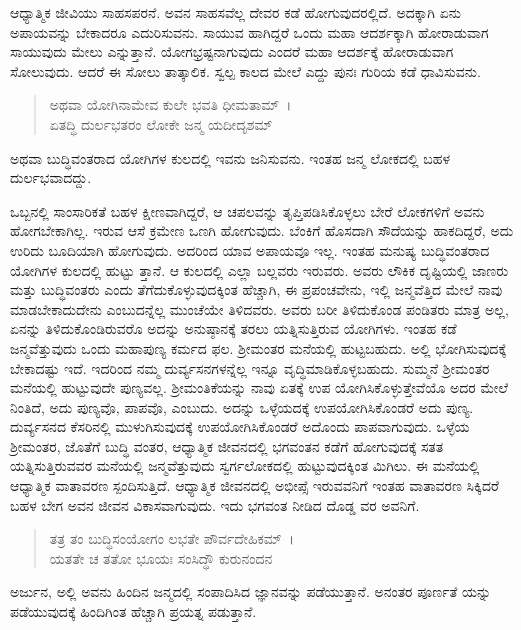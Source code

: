 ಆಧ್ಯಾತ್ಮಿಕ ಜೀವಿಯು ಸಾಹಸಪರನೆ. ಅವನ ಸಾಹಸವೆಲ್ಲ ದೇವರ ಕಡೆ ಹೋಗುವುದರಲ್ಲಿದೆ. ಅದಕ್ಕಾಗಿ ಏನು ಅಪಾಯವನ್ನು ಬೇಕಾದರೂ ಎದುರಿಸುವನು. ಸಾಯುವ ಹಾಗಿದ್ದರೆ ಒಂದು ಮಹಾ ಆದರ್ಶಕ್ಕಾಗಿ ಹೋರಾಡುವಾಗ ಸಾಯುವುದು ಮೇಲು ಎನ್ನುತ್ತಾನೆ. ಯೋಗಭ್ರಷ್ಟನಾಗುವುದು ಎಂದರೆ ಮಹಾ ಆದರ್ಶಕ್ಕೆ ಹೋರಾಡುವಾಗ ಸೋಲುವುದು. ಆದರೆ ಈ ಸೋಲು ತಾತ್ಕಾಲಿಕ. ಸ್ವಲ್ಪ ಕಾಲದ ಮೇಲೆ ಎದ್ದು ಪುನಃ ಗುರಿಯ ಕಡೆ ಧಾವಿಸುವನು.

\begin{verse}
ಅಥವಾ ಯೋಗಿನಾಮೇವ ಕುಲೇ ಭವತಿ ಧೀಮತಾಮ್~।\\ಏತದ್ಧಿ ದುರ್ಲಭತರಂ ಲೋಕೇ ಜನ್ಮ ಯದೀದೃಶಮ್ 
\end{verse}

{\small ಅಥವಾ ಬುದ್ಧಿವಂತರಾದ ಯೋಗಿಗಳ ಕುಲದಲ್ಲಿ ಇವನು ಜನಿಸುವನು. ಇಂತಹ ಜನ್ಮ ಲೋಕದಲ್ಲಿ ಬಹಳ ದುರ್ಲಭವಾದದ್ದು.}

ಒಬ್ಬನಲ್ಲಿ ಸಾಂಸಾರಿಕತೆ ಬಹಳ ಕ್ಷೀಣವಾಗಿದ್ದರೆ, ಆ ಚಪಲವನ್ನು ತೃಪ್ತಿಪಡಿಸಿಕೊಳ್ಳಲು ಬೇರೆ ಲೋಕಗಳಿಗೆ ಅವನು ಹೋಗಬೇಕಾಗಿಲ್ಲ. ಇರುವ ಆಸೆ ಕ್ರಮೇಣ ಒಣಗಿ ಹೋಗುವುದು. ಬೆಂಕಿಗೆ ಹೊಸದಾಗಿ ಸೌದೆಯನ್ನು ಹಾಕದಿದ್ದರೆ, ಅದು ಉರಿದು ಬೂದಿಯಾಗಿ ಹೋಗುವುದು. ಅದರಿಂದ ಯಾವ ಅಪಾಯವೂ ಇಲ್ಲ. ಇಂತಹ ಮನುಷ್ಯ ಬುದ್ಧಿವಂತರಾದ ಯೋಗಿಗಳ ಕುಲದಲ್ಲಿ ಹುಟ್ಟು ತ್ತಾನೆ. ಆ ಕುಲದಲ್ಲಿ ಎಲ್ಲಾ ಬಲ್ಲವರು ಇರುವರು. ಅವರು ಲೌಕಿಕ ದೃಷ್ಟಿಯಲ್ಲಿ ಜಾಣರು ಮತ್ತು ಬುದ್ಧಿವಂತರು ಎಂದು ತೆಗೆದುಕೊಳ್ಳುವುದಕ್ಕಿಂತ ಹೆಚ್ಚಾಗಿ, ಈ ಪ್ರಪಂಚವೇನು, ಇಲ್ಲಿ ಜನ್ಮವೆತ್ತಿದ ಮೇಲೆ ನಾವು ಮಾಡಬೇಕಾದುದೇನು ಎಂಬುದನ್ನೆಲ್ಲ ಮುಂಚೆಯೇ ತಿಳಿದವರು. ಅವರು ಬರೀ ತಿಳಿದುಕೊಂಡ ಪಂಡಿತರು ಮಾತ್ರ ಅಲ್ಲ, ಏನನ್ನು ತಿಳಿದುಕೊಂಡಿರುವರೊ ಅದನ್ನು ಅನುಷ್ಠಾನಕ್ಕೆ ತರಲು ಯತ್ನಿಸುತ್ತಿರುವ ಯೋಗಿಗಳು. ಇಂತಹ ಕಡೆ ಜನ್ಮವೆತ್ತುವುದು ಒಂದು ಮಹಾಪುಣ್ಯ ಕರ್ಮದ ಫಲ. ಶ‍್ರೀಮಂತರ ಮನೆಯಲ್ಲಿ ಹುಟ್ಟಬಹುದು. ಅಲ್ಲಿ ಭೋಗಿಸುವುದಕ್ಕೆ ಬೇಕಾದಷ್ಟು ಇದೆ. ಇದರಿಂದ ನಮ್ಮ ದುರ್ವ್ಯಸನಗಳನ್ನೆಲ್ಲ ಇನ್ನೂ ವೃದ್ಧಿಮಾಡಿಕೊಳ್ಳಬಹುದು. ಸುಮ್ಮನೆ ಶ‍್ರೀಮಂತರ ಮನೆಯಲ್ಲಿ ಹುಟ್ಟುವುದೇ ಪುಣ್ಯವಲ್ಲ. ಶ‍್ರೀಮಂತಿಕೆಯನ್ನು ನಾವು ಏತಕ್ಕೆ ಉಪ ಯೋಗಿಸಿಕೊಳ್ಳುತ್ತೇವೆಯೊ ಅದರ ಮೇಲೆ ನಿಂತಿದೆ, ಅದು ಪುಣ್ಯವೊ, ಪಾಪವೊ, ಎಂಬುದು. ಅದನ್ನು ಒಳ್ಳೆಯದಕ್ಕೆ ಉಪಯೋಗಿಸಿಕೊಂಡರೆ ಅದು ಪುಣ್ಯ. ದುರ್ವ್ಯಸನದ ಕೆಸರಿನಲ್ಲಿ ಮುಳುಗಿಸುವುದಕ್ಕೆ ಉಪಯೋಗಿಸಿಕೊಂಡರೆ ಅದೊಂದು ಪಾಪವಾಗುವುದು. ಒಳ್ಳೆಯ ಶ‍್ರೀಮಂತರ, ಜೊತೆಗೆ ಬುದ್ಧಿ ವಂತರ, ಆಧ್ಯಾತ್ಮಿಕ ಜೀವನದಲ್ಲಿ ಭಗವಂತನ ಕಡೆಗೆ ಹೋಗುವುದಕ್ಕೆ ಸತತ ಯತ್ನಿಸುತ್ತಿರುವವರ ಮನೆಯಲ್ಲಿ ಜನ್ಮವೆತ್ತುವುದು ಸ್ವರ್ಗಲೋಕದಲ್ಲಿ ಹುಟ್ಟುವುದಕ್ಕಿಂತ ಮಿಗಿಲು. ಈ ಮನೆಯಲ್ಲಿ ಆಧ್ಯಾತ್ಮಿಕ ವಾತಾವರಣ ಸ್ಪಂದಿಸುತ್ತಿದೆ. ಆಧ್ಯಾತ್ಮಿಕ ಜೀವನದಲ್ಲಿ ಅಭೀಪ್ಸೆ ಇರುವವನಿಗೆ ಇಂತಹ ವಾತಾವರಣ ಸಿಕ್ಕಿದರೆ ಬಹಳ ಬೇಗ ಅವನ ಜೀವನ ವಿಕಾಸವಾಗುವುದು. ಇದು ಭಗವಂತ ನೀಡಿದ ದೊಡ್ಡ ವರ ಅವನಿಗೆ.

\begin{verse}
ತತ್ರ ತಂ ಬುದ್ಧಿಸಂಯೋಗಂ ಲಭತೇ ಪೌರ್ವದೇಹಿಕಮ್~।\\ಯತತೇ ಚ ತತೋ ಭೂಯಃ ಸಂಸಿದ್ಧೌ ಕುರುನಂದನ 
\end{verse}

{\small ಅರ್ಜುನ, ಅಲ್ಲಿ ಅವನು ಹಿಂದಿನ ಜನ್ಮದಲ್ಲಿ ಸಂಪಾದಿಸಿದ ಜ್ಞಾನವನ್ನು ಪಡೆಯುತ್ತಾನೆ. ಅನಂತರ ಪೂರ್ಣತೆ ಯನ್ನು ಪಡೆಯುವುದಕ್ಕೆ ಹಿಂದಿಗಿಂತ ಹೆಚ್ಚಾಗಿ ಪ್ರಯತ್ನ ಪಡುತ್ತಾನೆ.}

